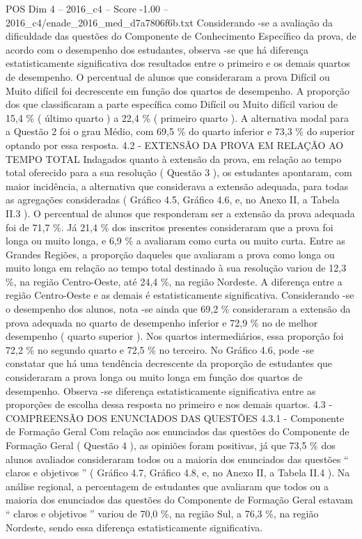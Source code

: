 \begin{textsample}{POS Dim 4 – 2016\_c4 – Score -1.00 – 2016\_c4/enade\_2016\_med\_d7a7806f6b.txt}
Considerando -se a avaliação da dificuldade das questões do Componente de Conhecimento Específico da prova, de acordo com o desempenho dos estudantes, observa -se que há diferença estatisticamente significativa dos resultados entre o primeiro e os demais quartos de desempenho.
O percentual de alunos que consideraram a prova Difícil ou Muito difícil foi decrescente em função dos quartos de desempenho.
A proporção dos que classificaram a parte específica como Difícil ou Muito difícil variou de 15,4 \% ( último quarto ) a 22,4 \% ( primeiro quarto ).
A alternativa modal para a Questão 2 foi o grau Médio, com 69,5 \% do quarto inferior e 73,3 \% do superior optando por essa resposta. 4.2 - EXTENSÃO DA PROVA EM RELAÇÃO AO TEMPO TOTAL Indagados quanto à extensão da prova, em relação ao tempo total oferecido para a sua resolução ( Questão 3 ), os estudantes apontaram, com maior incidência, a alternativa que considerava a extensão adequada, para todas as agregações consideradas ( Gráfico 4.5, Gráfico 4.6, e, no Anexo II, a Tabela II.3 ).
O percentual de alunos que responderam ser a extensão da prova adequada foi de 71,7 \%.
Já 21,4 \% dos inscritos presentes consideraram que a prova foi longa ou muito longa, e 6,9 \% a avaliaram como curta ou muito curta.
Entre as Grandes Regiões, a proporção daqueles que avaliaram a prova como longa ou muito longa em relação ao tempo total destinado à sua resolução variou de 12,3 \%, na região Centro-Oeste, até 24,4 \%, na região Nordeste.
A diferença entre a região Centro-Oeste e as demais é estatisticamente significativa.
Considerando -se o desempenho dos alunos, nota -se ainda que 69,2 \% consideraram a extensão da prova adequada no quarto de desempenho inferior e 72,9 \% no de melhor desempenho ( quarto superior ).
Nos quartos intermediários, essa proporção foi 72,2 \% no segundo quarto e 72,5 \% no terceiro.
No Gráfico 4.6, pode -se constatar que há uma tendência decrescente da proporção de estudantes que consideraram a prova longa ou muito longa em função dos quartos de desempenho.
Observa -se diferença estatisticamente significativa entre as proporções de escolha dessa resposta no primeiro e nos demais quartos. 4.3 - COMPREENSÃO DOS ENUNCIADOS DAS QUESTÕES 4.3.1 - Componente de Formação Geral Com relação aos enunciados das questões do Componente de Formação Geral ( Questão 4 ), as opiniões foram positivas, já que 73,5 \% dos alunos avaliados consideraram todos ou a maioria dos enunciados das questões “ claros e objetivos ” ( Gráfico 4.7, Gráfico 4.8, e, no Anexo II, a Tabela II.4 ).
Na análise regional, a percentagem de estudantes que avaliaram que todos ou a maioria dos enunciados das questões do Componente de Formação Geral estavam “ claros e objetivos ” variou de 70,0 \%, na região Sul, a 76,3 \%, na região Nordeste, sendo essa diferença estatisticamente significativa.

\end{textsample}
